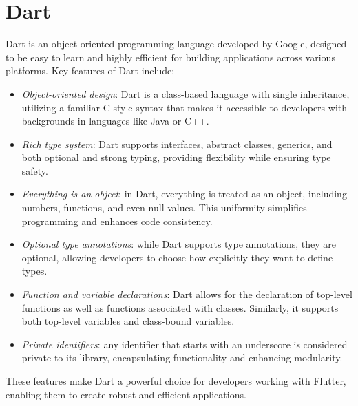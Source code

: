 \section{Dart}

Dart is an object-oriented programming language developed by Google, designed to be easy to learn and highly efficient for building applications across various platforms. 
Key features of Dart include:
\begin{itemize}
    \item \textit{Object-oriented design}: Dart is a class-based language with single inheritance, utilizing a familiar C-style syntax that makes it accessible to developers with backgrounds in languages like Java or C++.
    \item \textit{Rich type system}: Dart supports interfaces, abstract classes, generics, and both optional and strong typing, providing flexibility while ensuring type safety.
    \item \textit{Everything is an object}: in Dart, everything is treated as an object, including numbers, functions, and even null values.
        This uniformity simplifies programming and enhances code consistency.
    \item \textit{Optional type annotations}: while Dart supports type annotations, they are optional, allowing developers to choose how explicitly they want to define types.
    \item \textit{Function and variable declarations}: Dart allows for the declaration of top-level functions as well as functions associated with classes. 
        Similarly, it supports both top-level variables and class-bound variables.
    \item \textit{Private identifiers}: any identifier that starts with an underscore is considered private to its library, encapsulating functionality and enhancing modularity.
\end{itemize}
These features make Dart a powerful choice for developers working with Flutter, enabling them to create robust and efficient applications.